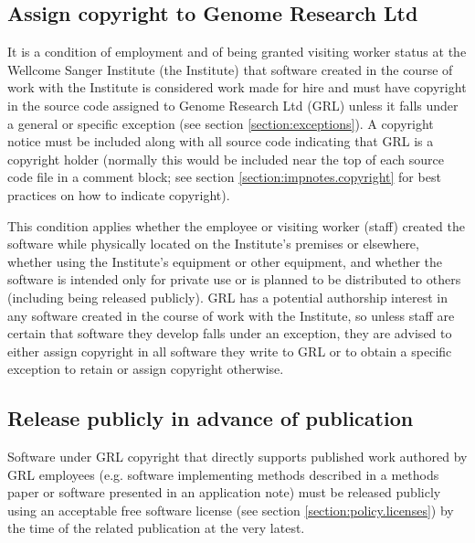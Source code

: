 \documentclass[10pt,a4paper]{article}
\begin{document}
\subsection{Assign copyright to Genome Research Ltd}
\label{section:policy.copyright}
\par It is a condition of employment and of being granted visiting worker status 
at the Wellcome Sanger Institute (the Institute) that software created in the 
course of work with the Institute is considered work made for hire and must have 
copyright in the source code assigned to Genome Research Ltd (GRL) unless it 
falls under a general or specific exception (see section \ref{section:exceptions}). 
A copyright notice must be included along with all source code indicating that 
GRL is a copyright holder (normally this would be included near the top of each 
source code file in a comment block; see section \ref{section:impnotes.copyright} 
for best practices on how to indicate copyright). 

\par This condition applies whether the employee or visiting worker (staff) 
created the software while physically located on the Institute's premises or 
elsewhere, whether using the Institute's equipment or other equipment, and 
whether the software is intended only for private use or is planned to be 
distributed to others (including being released publicly). GRL has a potential 
authorship interest in any software created in the course of work with the 
Institute, so unless staff are certain that software they develop falls 
under an exception, they are advised to either assign copyright in all software 
they write to GRL or to obtain a specific exception to retain or assign copyright 
otherwise.


\subsection{Release publicly in advance of publication}

\par Software under GRL copyright that directly supports published work authored 
by GRL employees (e.g. software implementing methods described in a methods 
paper or software presented in an application note) must be released publicly 
using an acceptable free software license (see section \ref{section:policy.licenses}) 
by the time of the related publication at the very latest. 
\end{document}
